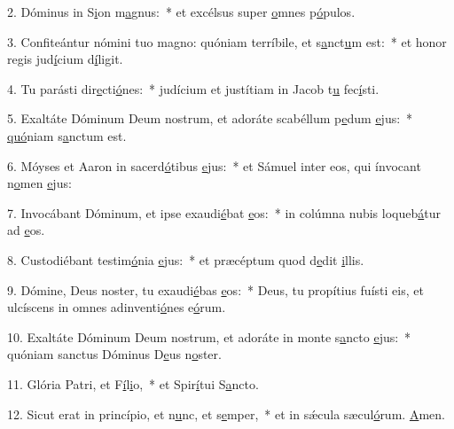 2. Dóminus in S\uline{i}on m\uline{a}gnus:~* et excélsus super \uline{o}mnes p\uline{ó}pulos.\par 
3. Confiteántur nómini tuo magno: quóniam terríbile, et s\uline{a}nct\uline{u}m est:~* et honor regis jud\uline{í}cium d\uline{í}ligit.\par 
4. Tu parásti dir\uline{e}cti\uline{ó}nes:~* judícium et justítiam in Jacob t\uline{u} fec\uline{í}sti.\par 
5. Exaltáte Dóminum Deum nostrum, et adoráte scabéllum p\uline{e}dum \uline{e}jus:~* \uline{quó}niam s\uline{a}nctum est.\par 
6. Móyses et Aaron in sacerd\uline{ó}tibus \uline{e}jus:~* et Sámuel inter eos, qui ínvocant n\uline{o}men \uline{e}jus:\par 
7. Invocábant Dóminum, et ipse exaudi\uline{é}bat \uline{e}os:~* in colúmna nubis loqueb\uline{á}tur ad \uline{e}os.\par 
8. Custodiébant testim\uline{ó}nia \uline{e}jus:~* et præcéptum quod d\uline{e}dit \uline{i}llis.\par 
9. Dómine, Deus noster, tu exaudi\uline{é}bas \uline{e}os:~* Deus, tu propítius fuísti eis, et ulcíscens in omnes adinventi\uline{ó}nes e\uline{ó}rum.\par 
10. Exaltáte Dóminum Deum nostrum, et adoráte in monte s\uline{a}ncto \uline{e}jus:~* quóniam sanctus Dóminus D\uline{e}us n\uline{o}ster.\par 
11. Glória Patri, et F\uline{í}l\uline{i}o,~* et Spir\uline{í}tui S\uline{a}ncto.\par 
12. Sicut erat in princípio, et n\uline{u}nc, et s\uline{e}mper,~* et in sǽcula sæcul\uline{ó}rum. \uline{A}men.\par 
